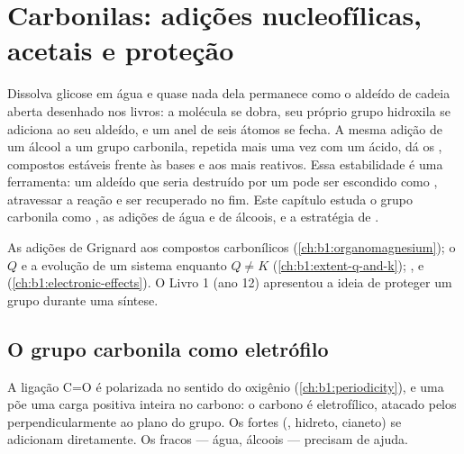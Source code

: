 \chapter{Carbonilas: adições nucleofílicas, acetais e proteção}\label{ch:b1:acetals-protection}

Dissolva glicose em água e quase nada dela permanece como o aldeído de
cadeia aberta desenhado nos livros: a molécula se dobra, seu próprio grupo
hidroxila se adiciona ao seu aldeído, e um anel de seis átomos se fecha. A
mesma adição de um álcool a um grupo carbonila, repetida mais uma vez com
um  ácido, dá os , compostos estáveis frente às bases e
aos  mais reativos. Essa estabilidade é uma ferramenta: um
aldeído que seria destruído por um  pode ser
escondido como , atravessar a reação e ser recuperado no fim. Este
capítulo estuda o grupo carbonila como , as adições de água e
de álcoois, e a estratégia de .

\begin{recall}
As adições de Grignard aos compostos carbonílicos (\cref{ch:b1:organomagnesium});
o  $Q$ e a evolução de um sistema enquanto $Q \neq K$
(\cref{ch:b1:extent-q-and-k}); ,  e
 (\cref{ch:b1:electronic-effects}). O Livro 1 (ano 12)
apresentou a ideia de proteger um grupo durante uma síntese.
\end{recall}

\section{O grupo carbonila como eletrófilo}

A ligação C=O é polarizada no sentido do oxigênio (\cref{ch:b1:periodicity}),
e uma   põe uma carga positiva inteira no
carbono: o carbono é eletrofílico, atacado pelos 
perpendicularmente ao plano do grupo. Os  fortes (, hidreto, cianeto) se adicionam diretamente. Os 
fracos --- água, álcoois --- precisam de ajuda.

